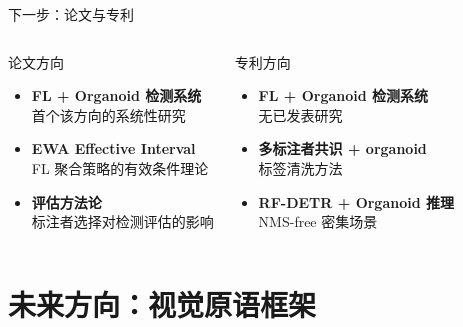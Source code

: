 \documentclass[aspectratio=169, 10pt]{beamer}
\begin{document}
\begin{frame}{下一步：论文与专利}
  \begin{columns}[T]
    \begin{block}{论文方向}
      \begin{itemize}
        \item \textbf{FL + Organoid 检测系统}\\
              首个该方向的系统性研究
        \item \textbf{EWA Effective Interval}\\
              FL 聚合策略的有效条件理论
        \item \textbf{评估方法论}\\
              标注者选择对检测评估的影响
      \end{itemize}
    \end{block}
    \begin{block}{专利方向}
      \begin{itemize}
        \item \textbf{FL + Organoid 检测系统}\\
              无已发表研究
        \item \textbf{多标注者共识 + organoid}\\
              标签清洗方法
        \item \textbf{RF-DETR + Organoid 推理}\\
              NMS-free 密集场景
      \end{itemize}
    \end{block}
  \end{columns}
\end{frame}

\section{未来方向：视觉原语框架}
\end{document}
